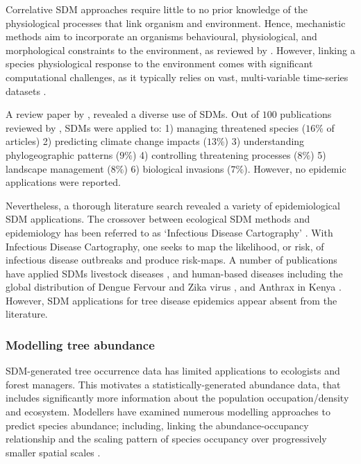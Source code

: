 Correlative SDM approaches require little to no prior knowledge of the physiological processes that link organism and environment.
Hence, mechanistic methods aim to incorporate an organisms behavioural, physiological, and morphological constraints to the environment, 
as reviewed by \cite{kearney2009mechanistic}. However, linking a species physiological response to the environment comes with significant
computational challenges, as it typically relies on vast, multi-variable time-series datasets \cite{shabani2016comparison}.

A review paper by \cite{guillera2015my}, revealed a diverse use of SDMs.
Out of $100$ publications reviewed by \cite{guillera2015my}, SDMs were applied to: 
1) managing threatened species ($16\% $ of articles) 
2) predicting climate change impacts ($13\%$) 
3) understanding phylogeographic patterns ($9\%$) 
4) controlling threatening processes ($8\%$) 
5) landscape management ($8\%$) 
6) biological invasions ($7\%$). However, no epidemic applications were reported.

Nevertheless, a thorough literature search revealed a variety of epidemiological SDM applications.
The crossover between ecological SDM methods and epidemiology has been referred to as `Infectious Disease Cartography' \cite{KRAEMER201619}.
With Infectious Disease Cartography, one seeks to map the likelihood, or risk, of infectious disease outbreaks and produce risk-maps.
A number of publications have applied SDMs livestock diseases \cite{hollings2017species}, and human-based diseases including the global 
distribution of Dengue Fervour \cite{bhatt2013global} and Zika virus \cite{messina2016mapping}, and Anthrax in Kenya \cite{otieno2021modeling}.
However, SDM applications for tree disease epidemics appear absent from the literature.

\subsubsection{Modelling tree abundance}

SDM-generated tree occurrence data has limited applications to ecologists and forest managers.
This motivates a statistically-generated abundance data, that includes significantly 
more information about the population occupation/density and ecosystem.
Modellers have examined numerous modelling approaches to predict species abundance;
including, linking the abundance-occupancy relationship \cite{gaston2000abundance} and
the scaling pattern of species occupancy over progressively smaller spatial scales \cite{hui2009extrapolating}.

